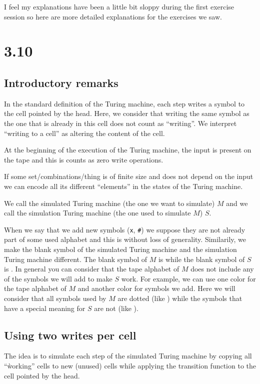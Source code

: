 \documentclass{article}
\newcommand\obullet[1]{\ThisStyle{\ensurestackMath{%
  \stackon[1pt]{\SavedStyle#1}{\SavedStyle\kern.6\LMpt\bullet}}}}
\newcommand{\blank}{\textvisiblespace}
\begin{document}
I feel my explanations have been a little bit sloppy during the first exercise
session so here are more detailed explanations for the exercises we saw.

\section*{3.10}

\subsection*{Introductory remarks}
In the standard definition of the Turing machine, each step writes a symbol to
the cell pointed by the head. Here, we consider that writing the same symbol as
the one that is already in this cell does not count as ``writing''. We
interpret ``writing to a cell'' as altering the content of the cell.

At the beginning of the execution of the Turing machine, the input is
present on the tape and this is counts as zero write operations.

If some set/combinations/thing is of finite size and does not depend on the input
we can encode all its different ``elements'' in the states of the Turing machine.

We call the simulated Turing machine (the one we want to simulate) \(M\) and we
call the simulation Turing machine (the one used to simulate \(M\)) \(S\).

When we say that we add new symbols (\texttt{x}, \texttt{\#}) we suppose they
are not already part of some used alphabet and this is without loss of
generality.
Similarily, we make the blank symbol of the simulated Turing machine and the
simulation Turing machine different. The blank symbol of \(M\)
is \texttt{\obullet{\blank}} while the blank symbol of \(S\)
is \texttt{\blank}. In general you can consider that the tape alphabet of \(M\)
does not include any of the symbols we will add to make \(S\) work.
For example, we can use one color for the tape alphabet of \(M\) and
another color for symbols we add. Here we will consider that all symbols used
by \(M\) are dotted (like \texttt{\obullet{\blank}}) while the symbols that
have a special meaning for \(S\) are not (like \texttt{\blank}).

\subsection*{Using two writes per cell}
The idea is to simulate each step of the simulated
Turing machine by copying all ``ẁorking'' cells to new (unused) cells
while applying the transition function to the cell pointed by the head.
\end{document}
